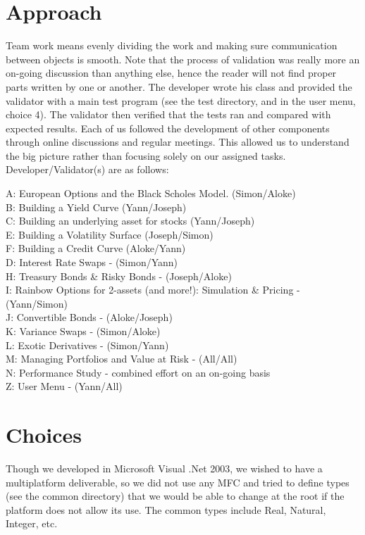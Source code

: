 \section{Approach}

Team work means evenly dividing the work and making sure communication between objects is smooth. Note that the process of validation was really more an on-going discussion than anything else, hence the reader will not find proper parts written by one or another. The developer wrote his class and provided the validator with a main test program (see the test directory, and in the user menu, choice 4).  The validator then verified that the tests ran and compared with expected results. Each of us followed the development of other components through online discussions and regular meetings.  This allowed us to understand the big picture rather than focusing solely on our assigned tasks.
Developer/Validator(s) are as follows:

\noindent A: European Options and the Black Scholes Model. (Simon/Aloke)\\
B: Building a Yield Curve (Yann/Joseph)\\
C: Building an underlying asset for stocks (Yann/Joseph)\\
E: Building a Volatility Surface (Joseph/Simon)\\
F: Building a Credit Curve (Aloke/Yann)\\
D: Interest Rate Swaps - (Simon/Yann)\\
H: Treasury Bonds \& Risky Bonds - (Joseph/Aloke)\\
I: Rainbow Options for 2-assets (and more!): Simulation \& Pricing - (Yann/Simon)\\
J: Convertible Bonds - (Aloke/Joseph)\\
K: Variance Swaps - (Simon/Aloke)\\
L: Exotic Derivatives - (Simon/Yann)\\
M: Managing Portfolios and Value at Risk - (All/All)\\
N: Performance Study - combined effort on an on-going basis\\
Z: User Menu - (Yann/All)\\

\section{Choices}

Though we developed in Microsoft Visual .Net 2003, we wished to have a multiplatform deliverable, so we did not use any MFC and tried to define types (see the common directory) that we would be able to change at the root if the platform does not allow its use. The common types include Real, Natural, Integer, etc.

